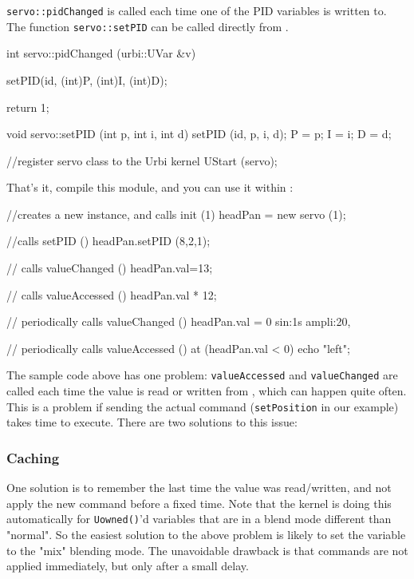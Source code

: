\lstinline{servo::pidChanged} is called each time one of the PID
variables is written to. The function \lstinline{servo::setPID} can be
called directly from \urbi.

\begin{cxx}
int
servo::pidChanged (urbi::UVar &v)
{
  setPID(id, (int)P, (int)I, (int)D);

  return 1;
}

void
servo::setPID (int p, int i, int d)
{
  setPID (id, p, i, d);
  P = p;
  I = i;
  D = d;
}

//register servo class to the Urbi kernel
UStart (servo);
\end{cxx}

That's it, compile this module, and you can use it within \urbi:

\begin{urbiscript}
//creates a new instance, and calls init (1)
headPan = new servo (1);

//calls setPID ()
headPan.setPID (8,2,1);

// calls valueChanged ()
headPan.val=13;

// calls valueAccessed ()
headPan.val * 12;

// periodically calls valueChanged ()
headPan.val = 0 sin:1s ampli:20,

// periodically calls valueAccessed ()
at (headPan.val < 0)
  echo "left";
\end{urbiscript}

The sample code above has one problem: \lstinline{valueAccessed} and
\lstinline{valueChanged} are called each time the value is read or
written from \urbi, which can happen quite often. This is a problem if
sending the actual command (\lstinline{setPosition} in our example)
takes time to execute. There are two solutions to this issue:

\subsubsection{Caching}

One solution is to remember the last time the value was read/written,
and not apply the new command before a fixed time. Note that the
kernel is doing this automatically for \lstinline{Uowned()}'d
variables that are in a blend mode different than "normal". So the
easiest solution to the above problem is likely to set the variable to
the "mix" blending mode. The unavoidable drawback is that commands are
not applied immediately, but only after a small delay.


